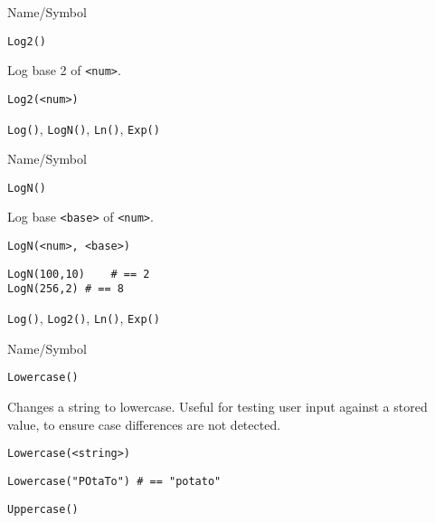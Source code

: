 \rl


\begin{desc}{Name/Symbol}
\item[Name/Symbol]	\verb+Log2()+

\item[Description]	Log base 2 of \verb+<num>+.

\item[Usage]
\begin{verbatim}
Log2(<num>)
\end{verbatim}

\item[Example]	

\item[See Also]	\verb+Log()+, \verb+LogN()+, \verb+Ln()+, \verb+Exp()+
\end{desc}

\rl


\begin{desc}{Name/Symbol}
\item[Name/Symbol]	\verb+LogN()+

\item[Description]	Log base \verb+<base>+ of \verb+<num>+.

\item[Usage]
\begin{verbatim}
LogN(<num>, <base>)
\end{verbatim}

\item[Example]
\begin{verbatim}
LogN(100,10)	# == 2
LogN(256,2)	# == 8
\end{verbatim}

\item[See Also]	\verb+Log()+, \verb+Log2()+, \verb+Ln()+, \verb+Exp()+
\end{desc}

\rl


\begin{desc}{Name/Symbol}
\item[Name/Symbol]	\verb+Lowercase()+

\item[Description]	Changes a string to lowercase.  Useful for testing user
		input against a stored value, to ensure case differences
		are not detected.

\item[Usage]
\begin{verbatim}
Lowercase(<string>)
\end{verbatim}

\item[Example]
\begin{verbatim}
Lowercase("POtaTo")	# == "potato"
\end{verbatim}

\item[See Also]	\verb+Uppercase()+
\end{desc}

